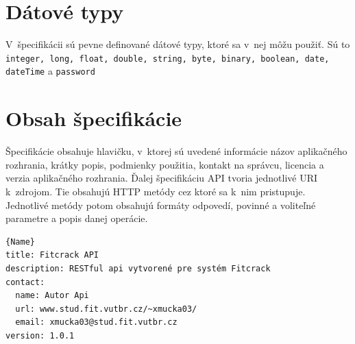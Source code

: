 \documentclass[../projekt.tex]{subfiles}
\begin{document}
\section{Dátové typy}
V~špecifikácii sú pevne definované dátové typy, ktoré sa v~nej môžu použiť. Sú to \texttt{integer, long, float, double, string, byte, binary, boolean, date, dateTime} a \texttt{password}

\section{Obsah špecifikácie}
Špecifikácie obsahuje hlavičku, v~ktorej sú uvedené informácie názov aplikačného rozhrania, krátky popis, podmienky použitia, kontakt na správcu, licencia a verzia aplikačného rozhrania. Ďalej špecifikáciu API tvoria jednotlivé URI k~zdrojom. Tie obsahujú HTTP metódy cez ktoré sa k~nim pristupuje. Jednotlivé metódy potom obsahujú formáty odpovedí, povinné a voliteľné parametre a popis danej operácie.
\newline


\begin{lstlisting}[caption=Príklad hlavičky OAS,frame=tlrb]{Name}
title: Fitcrack API
description: RESTful api vytvorené pre systém Fitcrack
contact:
  name: Autor Api
  url: www.stud.fit.vutbr.cz/~xmucka03/
  email: xmucka03@stud.fit.vutbr.cz
version: 1.0.1
\end{lstlisting}
\end{document}
